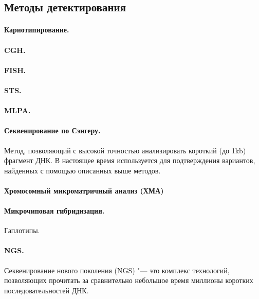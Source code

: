\documentclass[a4paper,12pt]{article}
\begin{document}
\subsection{Методы детектирования}

\paragraph{Кариотипирование.}

\paragraph{CGH.}

\paragraph{FISH.}

\paragraph{STS.}

\paragraph{MLPA.}

\paragraph{Секвенирование по Сэнгеру.}
Метод, позволяющий с высокой точностью анализировать короткий (до 1kb) фрагмент ДНК\cite{sanger}.
В настоящее время используется для подтверждения вариантов, найденных с помощью описанных выше методов.

\paragraph{Хромосомный микроматричный анализ (ХМА)}

\paragraph{Микрочиповая гибридизация.}
Гаплотипы.

\paragraph{NGS.}
Секвенирование нового поколения (NGS) "--- это комплекс технологий, позволяющих прочитать за сравнительно небольшое время миллионы коротких последовательностей ДНК.
\end{document}
